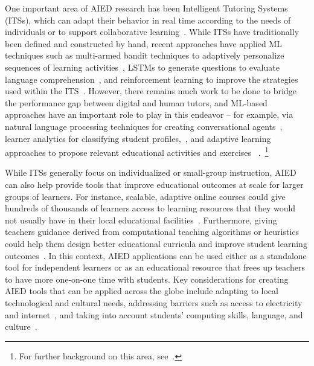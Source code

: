 \documentclass[11pt]{report}
\begin{document}
One important area of AIED research has been Intelligent Tutoring Systems (ITSs), which can adapt their behavior in real time according to the needs of individuals or to support collaborative learning~\cite{chaplot2018}. 
While ITSs have traditionally been defined and constructed by hand, recent approaches have applied ML techniques such as multi-armed bandit techniques to adaptively personalize sequences of learning activities~\cite{clement2013}, LSTMs to generate questions to evaluate language comprehension~\cite{du2017}, and reinforcement learning to improve the strategies used within the ITS~\cite{iglesias2009,koedinger2013}. However, there remains much work to be done to bridge the performance gap between digital and human tutors, and ML-based approaches have an important role to play in this endeavor -- for example, via natural language processing techniques for creating conversational agents~\cite{gnewuch2018}, learner analytics for classifying student profiles,~\cite{romero2008}, and adaptive learning approaches to propose relevant educational activities and exercises ~\cite{svihla2012}.~\footnote{For further background on this area, see~\cite{nkambou2010,joksimovic2018,pinkwart2016}.}

While ITSs generally focus on individualized or small-group instruction, AIED can also help provide tools that improve educational outcomes at scale for larger groups of learners. For instance, scalable, adaptive online courses could give hundreds of thousands of learners access to learning resources that they would not usually have in their local educational facilities~\cite{roll2018}. Furthermore, giving teachers guidance derived from computational teaching algorithms or heuristics could help them design better educational curricula and improve student learning outcomes~\cite{dede2009}. In this context, AIED applications can be used either as a standalone tool for independent learners or as an educational resource that frees up teachers to have more one-on-one time with students. Key considerations for creating AIED tools that can be applied across the globe include adapting to local technological and cultural needs, addressing barriers such as access to electricity and internet~\cite{khandker2009welfare1, khandker2009welfare2}, and taking into account students' computing skills, language, and culture~\cite{cakmak2014,nye2015}. 
\end{document}
